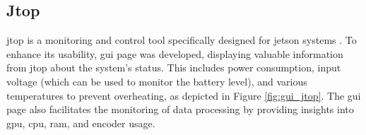 \subsection{Jtop}

\gls{jtop} is a monitoring and control tool specifically designed for \gls{jetson} systems \cite{bonghiJtopRbonghiJetson}.
To enhance its usability, \gls{gui} page was developed, displaying valuable information from \gls{jtop} about the \jx system's status.
This includes power consumption, input voltage (which can be used to monitor the battery level), and various temperatures to prevent overheating, as depicted in Figure \ref{fig:gui_jtop}.
The \gls{gui} page also facilitates the monitoring of data processing by providing insights into \gls{gpu}, \gls{cpu}, \gls{ram}, and encoder usage.

